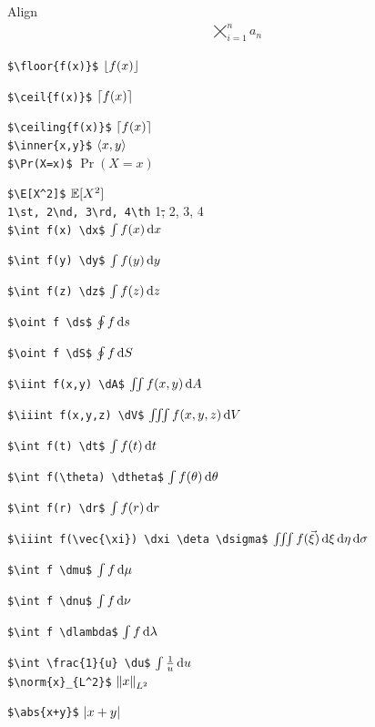 \documentclass[10pt,jtb]{article}
\begin{document}
Align
\begin{align*}
\bigtimes_{i=1}^n a_n
\end{align*}

\verb|$\floor{f(x)}$| \hfill $\left\lfloor f(x) \right\rfloor$

\verb|$\ceil{f(x)}$| \hfill $\left\lceil f(x) \right\rceil$

\verb|$\ceiling{f(x)}$| \hfill $\left\lceil f(x) \right\rceil$ \\

\verb|$\inner{x,y}$| \hfill $\left\langle x,y \right\rangle$ \\

\verb|$\Pr(X=x)$| \hfill $\Pr(X=x)$

\verb|$\E[X^2]$| \hfill $\mathbb{E}[X^2]$ \\

\verb|1\st, 2\nd, 3\rd, 4\th| \hfill 1\st, 2\nd, 3\rd, 4\th \\

\verb|$\int f(x) \dx$| \hfill $\int f(x) \, \mathrm{d} x$

\verb|$\int f(y) \dy$| \hfill $\int f(y) \, \mathrm{d} y$

\verb|$\int f(z) \dz$| \hfill $\int f(z) \, \mathrm{d} z$

\verb|$\oint f \ds$| \hfill $\oint f \, \mathrm{d} s$

\verb|$\oint f \dS$| \hfill $\oint f \, \mathrm{d} S$

\verb|$\iint f(x,y) \dA$| \hfill $\iint f(x,y) \, \mathrm{d} A$

\verb|$\iiint f(x,y,z) \dV$| \hfill $\iiint f(x,y,z) \, \mathrm{d} V$

\verb|$\int f(t) \dt$| \hfill $\int f(t) \, \mathrm{d} t$

\verb|$\int f(\theta) \dtheta$| \hfill $\int f(\theta) \, \mathrm{d} \theta$

\verb|$\int f(r) \dr$| \hfill $\int f(r) \, \mathrm{d} r$

\verb|$\iiint f(\vec{\xi}) \dxi \deta \dsigma$| \hfill $\iiint f(\vec{\xi}) \, \mathrm{d} \xi \, \mathrm{d} \eta \, \mathrm{d} \sigma$

\verb|$\int f \dmu$| \hfill $\int f \, \mathrm{d} \mu$

\verb|$\int f \dnu$| \hfill $\int f \, \mathrm{d} \nu$

\verb|$\int f \dlambda$| \hfill $\int f \, \mathrm{d} \lambda$

\verb|$\int \frac{1}{u} \du$| \hfill $\int \frac{1}{u} \, \mathrm{d} u$ \\

\verb|$\norm{x}_{L^2}$| \hfill $\left\| x \right\|_{L^2}$

\verb|$\abs{x+y}$| \hfill $\left| x+y \right|$ \\
\end{document}
